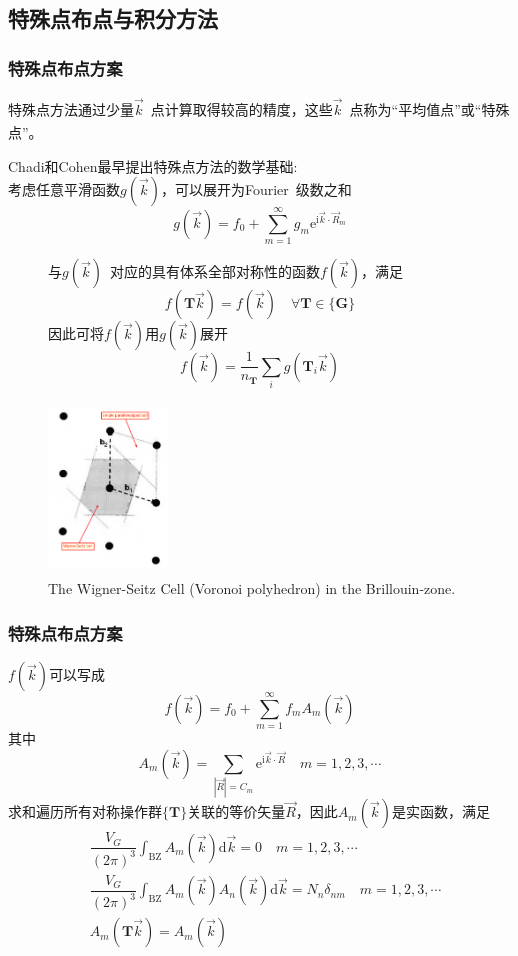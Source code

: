 \documentclass[cjk,slidestop,compress,mathserif,blue]{beamer}
\newcommand{\upcite}[1]{\hspace{0ex}\textsuperscript{\cite{#1}}} %
\begin{document}
\subsection{特殊点布点与积分方法}
\frame
{
	\frametitle{特殊点布点方案}
	特殊点方法通过少量$\vec k$~点计算取得较高的精度，这些$\vec k$~点称为“平均值点”\upcite{PRB7-5212_1973}或“特殊点”\upcite{PRB8-5747_1973}。
	
	\textrm{Chadi}和\textrm{Cohen}最早提出特殊点方法的数学基础:\\
	考虑任意平滑函数$g(\vec k)$，可以展开为\textrm{Fourier}~级数之和
	$$g(\vec k)=f_0+\sum_{m=1}^{\infty}g_m\mathrm{e}^{\mathrm{i}\vec k\cdot\vec R_m}$$
\begin{figure}[h!]
\begin{minipage}[t]{0.55\linewidth}
	与$g(\vec k)$~对应的具有体系全部对称性的函数$f(\vec k)$，满足
	$$f(\mathbf{T}\vec k)=f(\vec k)\quad\forall\mathbf{T}\in\{\mathbf{G}\}$$
	因此可将$f(\vec k)$用$g(\vec k)$展开
	$$f(\vec k)=\dfrac1{n_{\mathbf{T}}}\sum\limits_ig(\mathbf{T}_i\vec k)$$
\end{minipage}
\hfill
\begin{minipage}[t]{0.42\linewidth}
\centering
\vspace*{-0.5in}
\includegraphics[height=1.8in,width=1.25in,viewport=20 20 530 800,clip]{Figures/Reciprocal-WS.png}
\caption{\tiny \textrm{The Wigner-Seitz Cell (Voronoi polyhedron) in the Brillouin-zone.}}%
\label{Reciprocal-WS}
\end{minipage}
\end{figure} 
}

\frame
{
	\frametitle{特殊点布点方案}
	$f(\vec k)$可以写成
	$$f(\vec k)=f_0+\sum_{m=1}^{\infty}f_mA_m(\vec k)$$其中
	$$A_m(\vec k)=\sum_{|\vec R|=C_m}\mathrm{e}^{\mathrm{i}\vec k\cdot\vec R}\quad m=1,2,3,\cdots$$
	求和遍历所有对称操作群$\{\mathbf{T}\}$关联的等价矢量$\vec R$，因此$A_m(\vec k)$是实函数，满足
	\begin{displaymath}
		\begin{aligned}
			&\dfrac{V_G}{(2\pi)^3}\int_{\mathrm{BZ}}A_m(\vec k)\mathrm{d}\vec k=0\quad m=1,2,3,\cdots\\
			&\dfrac{V_G}{(2\pi)^3}\int_{\mathrm{BZ}}A_m(\vec k)A_n(\vec k)\mathrm{d}\vec k=N_n\delta_{nm}\quad m=1,2,3,\cdots\\
			&A_m(\mathbf{T}\vec k)=A_m(\vec k)
		\end{aligned}
	\end{displaymath}
}
\end{document}
